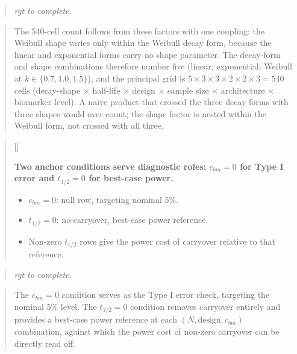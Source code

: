 \documentclass[
  11pt,
]{article}
\newcounter{pgraph}
\newenvironment{bullets}{%
  \stepcounter{pgraph}%
  \begin{quote}\small\sffamily\color[gray]{0.30}%
  {\normalfont\scriptsize\color[gray]{0.58}[\thepgraph]\enspace}}{%
  \end{quote}}
\newenvironment{rgt}{%
  \begin{quote}\small\itshape\color[RGB]{20,60,160}}{%
  \end{quote}}
\newenvironment{orig}{%
  \begin{quote}\normalsize\color[gray]{0.55}}{%
  \end{quote}}
\begin{document}
\begin{rgt}
rgt to complete.

\end{rgt}

\begin{orig}
The 540-cell count follows from these factors with one coupling: the
Weibull shape varies only within the Weibull decay form, because the
linear and exponential forms carry no shape parameter. The decay-form
and shape combinations therefore number five (linear; exponential;
Weibull at \(k \in \{0.7, 1.0, 1.5\}\)), and the principal grid is
\(5 \times 3 \times 3 \times 2 \times 2 \times 3 = 540\) cells
(decay-shape \(\times\) half-life \(\times\) design \(\times\) sample size
\(\times\) architecture \(\times\) biomarker level). A naive product that
crossed the three decay forms with three shapes would over-count; the
shape factor is nested within the Weibull form, not crossed with all
three.

\end{orig}

\begin{bullets}

\textbf{Two anchor conditions serve diagnostic roles: $c_{bm} = 0$
for Type I error and $t_{1/2} = 0$ for best-case power.}

\begin{itemize}\setlength{\itemsep}{2pt}\setlength{\parskip}{0pt}
\item $c_{bm} = 0$: null row, targeting nominal 5\%.
\item $t_{1/2} = 0$: no-carryover, best-case power reference.
\item Non-zero $t_{1/2}$ rows give the power cost of carryover
relative to that reference.
\end{itemize}

\end{bullets}

\begin{rgt}
rgt to complete.

\end{rgt}

\begin{orig}
The \(c_{bm} = 0\) condition serves as the Type I error check,
targeting the nominal 5\% level. The \(t_{1/2} = 0\) condition
removes carryover entirely and provides a best-case power
reference at each \((N, \text{design}, c_{bm})\) combination,
against which the power cost of non-zero carryover can be
directly read off.

\end{orig}
\end{document}
